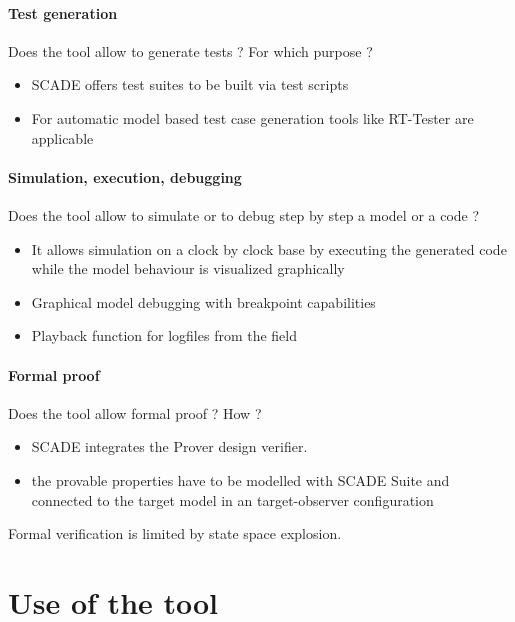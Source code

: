 \paragraph{Test generation}
Does the tool allow to generate tests ? For  which purpose ?

\begin{itemize}
	\item SCADE offers test suites to be built via test scripts
	\item For automatic model based test case generation tools like RT-Tester are applicable
\end{itemize}

\paragraph{Simulation, execution, debugging}
Does the tool allow to simulate or to debug step by step a model or a code ?

\begin{itemize}
	\item It allows simulation on a clock by clock base by executing the generated code while the model behaviour is visualized graphically
	\item Graphical model debugging with breakpoint capabilities
	\item Playback function for logfiles from the field
\end{itemize}

\paragraph{Formal proof}
Does the tool allow formal proof ?  How ?

\begin{itemize}
	\item SCADE integrates the Prover design verifier. 
	\item the provable properties have to be modelled with SCADE Suite and connected to the target model in an target-observer configuration
\end{itemize}


\begin{assessor1}
  Formal verification is limited by state space explosion.
\end{assessor1}

\section{Use of the tool}


